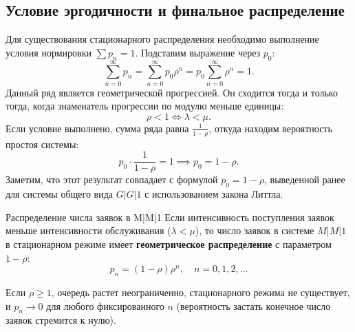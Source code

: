 \subsection*{Условие эргодичности и финальное распределение}

Для существования стационарного распределения необходимо выполнение условия нормировки $\sum p_n = 1$. Подставим выражение через $p_0$:
$$
\sum_{n=0}^{\infty} p_n = \sum_{n=0}^{\infty} p_0 \rho^n = p_0 \sum_{n=0}^{\infty} \rho^n = 1.
$$
Данный ряд является геометрической прогрессией. Он сходится тогда и только тогда, когда знаменатель прогрессии по модулю меньше единицы:
$$
\rho < 1 \iff \lambda < \mu.
$$
Если условие выполнено, сумма ряда равна $\frac{1}{1-\rho}$, откуда находим вероятность простоя системы:
$$
p_0 \cdot \frac{1}{1-\rho} = 1 \implies p_0 = 1 - \rho.
$$
Заметим, что этот результат совпадает с формулой $p_0 = 1 - \rho$, выведенной ранее для системы общего вида $G|G|1$ с использованием закона Литтла.

\begin{theorem}{Распределение числа заявок в M|M|1}
Если интенсивность поступления заявок меньше интенсивности обслуживания ($\lambda < \mu$), то число заявок в системе $M|M|1$ в стационарном режиме имеет \textbf{геометрическое распределение} с параметром $1-\rho$:
$$
p_n = (1 - \rho)\rho^n, \quad n = 0, 1, 2, \dots
$$
\end{theorem}

\begin{conseq}
Если $\rho \ge 1$, очередь растет неограниченно, стационарного режима не существует, и $p_n \to 0$ для любого фиксированного $n$ (вероятность застать конечное число заявок стремится к нулю).
\end{conseq}